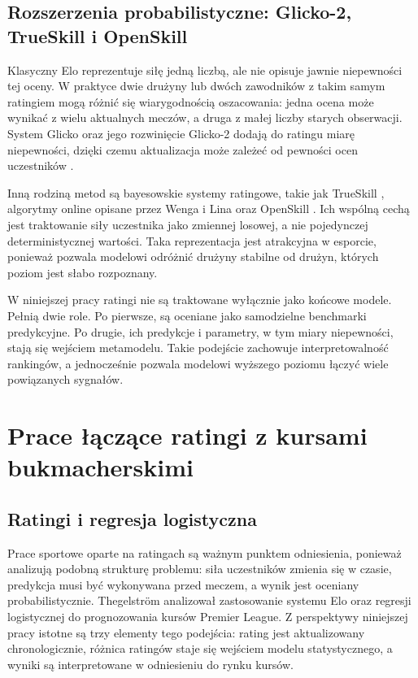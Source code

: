 \subsection{Rozszerzenia probabilistyczne: Glicko-2, TrueSkill i OpenSkill}

Klasyczny Elo reprezentuje siłę jedną liczbą, ale nie opisuje jawnie niepewności tej oceny. W
praktyce dwie drużyny lub dwóch zawodników z takim samym ratingiem mogą różnić się wiarygodnością
oszacowania: jedna ocena może wynikać z wielu aktualnych meczów, a druga z małej liczby starych
obserwacji. System Glicko oraz jego rozwinięcie Glicko-2 dodają do ratingu miarę niepewności, dzięki
czemu aktualizacja może zależeć od pewności ocen uczestników \parencite{glickman1995,glickman2012}.

Inną rodziną metod są bayesowskie systemy ratingowe, takie jak TrueSkill \parencite{trueskill2007},
algorytmy online opisane przez Wenga i Lina \parencite{weng2011onlineRanking} oraz OpenSkill
\parencite{openskill2024}. Ich wspólną cechą jest traktowanie siły uczestnika jako zmiennej losowej,
a nie pojedynczej deterministycznej wartości. Taka reprezentacja jest atrakcyjna w esporcie,
ponieważ pozwala modelowi odróżnić drużyny stabilne od drużyn, których poziom jest słabo rozpoznany.

W niniejszej pracy ratingi nie są traktowane wyłącznie jako końcowe modele. Pełnią dwie role. Po
pierwsze, są oceniane jako samodzielne benchmarki predykcyjne. Po drugie, ich predykcje i parametry,
w tym miary niepewności, stają się wejściem metamodelu. Takie podejście zachowuje interpretowalność
rankingów, a jednocześnie pozwala modelowi wyższego poziomu łączyć wiele powiązanych sygnałów.

\section{Prace łączące ratingi z kursami bukmacherskimi}

\subsection{Ratingi i regresja logistyczna}

Prace sportowe oparte na ratingach są ważnym punktem odniesienia, ponieważ analizują podobną
strukturę problemu: siła uczestników zmienia się w czasie, predykcja musi być wykonywana przed
meczem, a wynik jest oceniany probabilistycznie. Thegelström
\parencite{thegelstrom2023eloPremierLeagueOdds} analizował zastosowanie systemu Elo oraz regresji
logistycznej do prognozowania kursów Premier League. Z perspektywy niniejszej pracy istotne są trzy
elementy tego podejścia: rating jest aktualizowany chronologicznie, różnica ratingów staje się
wejściem modelu statystycznego, a wyniki są interpretowane w odniesieniu do rynku kursów.


